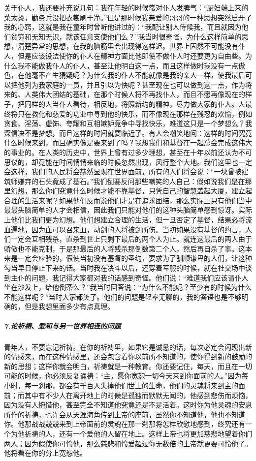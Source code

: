 \par 关于仆人，我还要补充说几句：我在年轻的时候常对仆人发脾气：“厨妇端上来的菜太烫，勤务兵没把衣裳刷干净。”但是那时候我亲爱的哥哥的一种思想突然启开了我的心窍，这就是我在童年时曾听他讲过的：“我配让别人侍候我，而且就因为他们贫穷和无知无识，就该任意支使他们么？”我当时很奇怪，为什么这样简单的思想，清楚异常的思想，在我的脑筋里会出现得这样迟。世界上固然不可能没有仆人，但是应该设法使你的仆人在精神方面比他即使不做仆人时还要更为自由些。为什么我不能做我仆人的仆人，甚至让他明白这一点，而且这样做时我没有一点傲色，在他毫不产生猜疑呢？为什么我的仆人不能就像是我的亲人一样，使我最后可以把他列为我家庭的一员，并且引以为快呢？甚至现在也可以做到这一点，作为将来的、人类伟大团结的基础，在那个时候人将不再找仆人，而且不愿再像现在的样子，把同样的人当仆人看待，相反地，将照新约的精神，尽力做大家的仆人。人最终将只在教化和慈爱的功业中寻到他的快乐，而不像现在那样在残忍的欢愉，例如贪食、淫荡、虚饰、夸耀和互相嫉妒竞争中寻找快乐，难道这只是一个梦想么？我深信决不是梦想，而且这样的时间就要临近了。有人会嘲笑地问：这样的时间究竟什么时候来到，而且确实像是要来到了吗？我想我们和基督在一起总会完成这伟大的事业的。在人类的历史中，世界上曾有过多少理想，甚至在十年以前还认为不可思议的，却竟能在时间悄悄来临的时候忽然出现，风行整个大地。我们这里也一定会这样，我们的人民将会赫然显现在世界面前，所有的人们将会说：“一块曾被建筑师嫌弃的石头竟成了基石。”我们倒要反问那些嘲笑的人自己：假如说我们是在那里幻想，那么你们究竟什么时候才能不靠基督，只凭自己的智慧盖起大厦，建立起合理的生活来呢？如果他们反而说他们才是在追求团结，那么实际上只有他们当中最最头脑简单的人才会相信，因此我们只能对他们的这种头脑简单感到惊讶。实际上他们比我们更为幻想。他们想建立合理的生活，但一旦否定了基督，结果必将流血遍地，因为血可以召来血，动剑的人将被剑所伤。当初如果没有基督的约言，人们一定会互相残杀，直杀到世上只剩下最后的两个人为止。就连这最后的两人由于骄傲也不能克制，于是那最后的人将残杀那倒数第二个人，然后再自杀了事。这本来是一定会应验的，假使当初没有基督的圣约，要求为了驯顺谦卑的人们，让这种勾当早日停止下来的话。当时我在决斗以后，还穿着军服的时候，就在社交场中谈到主仆的问题，我记得大家都对我的话感到奇怪。他们说：“难道我们应该请仆人坐在沙发上，给他倒茶么？”我当时回答说：“为什么不能呢？至少有的时候为什么不能这样呢？”当时大家都笑了。他们的问题是轻率无聊的，我的答语也是不够明确的，但是我想里面多少有点真理。
\subparagraph*{7.论祈祷、爱和与另一世界相连的问题}
\par 青年人，不要忘记祈祷。在你的祈祷里，如果它是诚恳的话，每次必定会闪现出新的情感来，而在这种情感里，还会包含着你以前所不知道的，使你得到新的鼓励的新的思想；这样你就会明白，祈祷就是一种教育。你还要记住，每天，而且在一切可能的时候，你必须反复诵祷：“主，愿你宽恕一切今天来到你面前的人。”因为每小时，每一刹那，都会有千百人失掉他们世上的生命，他们的灵魂将来到主的面前；而其中有不少人在离开地上的时候是孤独而默默无闻的，他感到悲伤而烦恼，因为没有人惋惜他，甚至完全不知道他究竟还是不是活着。这时你为他灵魂的安息所作的祈祷，也许会从天涯海角传到上帝的座前，虽然你不知道他，他也不知道你。他那战战兢兢来到上帝面前的灵魂在那一刹那将怎样欣慰地感到，终究还有一个为他祈祷的人，还有一个爱他的人留在地上。这样上帝也将更加慈悲地望着你们两人；因为假使你可怜他，那么慈悲和怜爱超过你无数倍的上帝就更要可怜他了。他将看在你的分上宽恕他。
